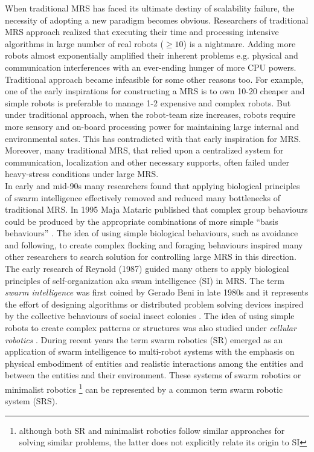 When traditional MRS has faced its ultimate destiny of scalability failure, the necessity of adopting a  new paradigm becomes obvious. Researchers of traditional MRS approach realized  that  executing their time and processing intensive algorithms in large number of real robots ($\geq 10$) is a nightmare. Adding more robots almost exponentially amplified their inherent  problems e.g. physical and communication interferences with an ever-ending hunger of more CPU powers. Traditional approach became infeasible for some other reasons too. For example, one of the early inspirations for constructing a MRS is to own 10-20 cheaper and simple robots is preferable to manage 1-2 expensive and complex robots. But under traditional approach, when the robot-team size increases,  robots require more sensory and on-board processing power for maintaining large internal and environmental sates. This has contradicted with that early inspiration for MRS. Moreover, many traditional MRS, that relied upon a centralized system for communication, localization and other necessary supports,  often failed under heavy-stress conditions under large MRS.\\ 
In early and mid-90s many researchers found that applying biological principles of swarm intelligence effectively removed and reduced many bottlenecks of traditional MRS.  In 1995 Maja Mataric published that complex group behaviours could be produced by the appropriate combinations of more simple ``basis behaviours'' \cite{Mataric1995}. The idea of using simple biological behaviours, such as avoidance and following, to create complex flocking and foraging behaviours inspired many other researchers to search solution for controlling large MRS in this direction.  The early research of Reynold (1987) guided many others to apply biological principles of self-organization aka swam intelligence (SI) in MRS.  The term {\em swarm intelligence} was first coined by Gerado Beni \cite{Beni2005} in late 1980s and it represents the effort of designing algorithms or distributed problem solving devices inspired by the collective behaviours of social insect colonies \cite{Bonabeau+1999}. The idea of using simple robots to create complex patterns or structures was also studied under {\em cellular robotics} \cite{Fukuda+1987}. During recent years the term swarm robotics (SR) emerged as an application of swarm intelligence to multi-robot systems with the emphasis on physical embodiment of entities and realistic interactions among the entities and between the entities and their environment. These systems of swarm robotics or minimalist robotics \footnote{although both SR and minimalist robotics follow similar approaches for solving similar problems, the latter does not explicitly relate its origin to SI} can be represented by a common term swarm robotic system (SRS).\\

